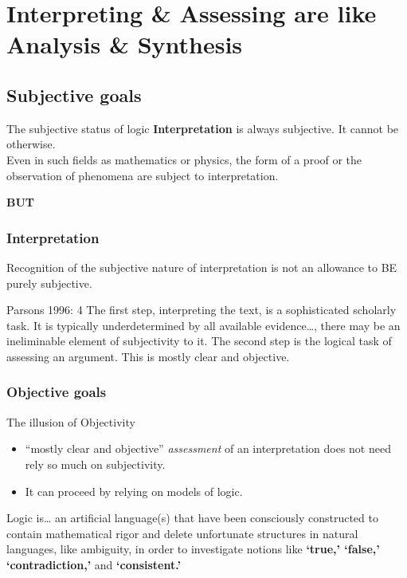 \documentclass{beamer}
\begin{document}
\section{Interpreting \& Assessing are like Analysis \& Synthesis}
\subsection{Subjective goals}
\begin{frame}{The subjective status of logic}
\textbf{Interpretation} is always subjective. It cannot be otherwise. 
\\
Even in such fields as mathematics or physics, the form of a proof or the observation of phenomena are subject to interpretation.\\
\pause

{\bf BUT}

\end{frame}

\begin{frame}\frametitle{Interpretation}
Recognition of the subjective nature of interpretation is not an allowance to BE purely subjective. \pause
\begin{block}{Parsons 1996: 4}
The first step, interpreting the text, is a sophisticated scholarly task.  It is typically underdetermined by all available evidence\dots, there may be an ineliminable element of subjectivity to it.  The second step is the logical task of assessing an argument.  This is mostly clear and objective.  
\end{block}  
\end{frame}

\subsubsection{Objective goals}
\begin{frame}{The illusion of Objectivity}
\begin{itemize}
\item  ``mostly clear and objective'' \textsl{assessment} of an interpretation does not need rely so much on subjectivity. 
\item It can proceed by relying on models of logic.
\end{itemize}
\pause
\begin{block}{Logic is\ldots} 
an artificial language(s) that have been consciously constructed to contain mathematical rigor and delete unfortunate structures in natural languages, like ambiguity, in order to investigate notions like {\bf `true,' `false,' `contradiction,'} and {\bf `consistent.'}
\end{block}
\end{frame}
\end{document}
